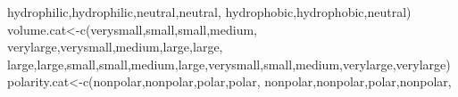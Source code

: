 \documentclass[
]{book}
\newenvironment{Shaded}{\begin{snugshade}}{\end{snugshade}}
\newcommand{\FunctionTok}[1]{\textcolor[rgb]{0.00,0.00,0.00}{#1}}
\newcommand{\NormalTok}[1]{#1}
\newcommand{\OtherTok}[1]{\textcolor[rgb]{0.56,0.35,0.01}{#1}}
\newcommand{\StringTok}[1]{\textcolor[rgb]{0.31,0.60,0.02}{#1}}
\begin{document}
\begin{Shaded}
\begin{Highlighting}[]
              \StringTok{\textquotesingle{}hydrophilic\textquotesingle{}}\NormalTok{,}\StringTok{\textquotesingle{}hydrophilic\textquotesingle{}}\NormalTok{,}\StringTok{\textquotesingle{}neutral\textquotesingle{}}\NormalTok{,}\StringTok{\textquotesingle{}neutral\textquotesingle{}}\NormalTok{,}
              \StringTok{\textquotesingle{}hydrophobic\textquotesingle{}}\NormalTok{,}\StringTok{\textquotesingle{}hydrophobic\textquotesingle{}}\NormalTok{,}\StringTok{\textquotesingle{}neutral\textquotesingle{}}\NormalTok{)}
\NormalTok{volume.cat}\OtherTok{\textless{}{-}}\FunctionTok{c}\NormalTok{(}\StringTok{\textquotesingle{}verysmall\textquotesingle{}}\NormalTok{,}\StringTok{\textquotesingle{}small\textquotesingle{}}\NormalTok{,}\StringTok{\textquotesingle{}small\textquotesingle{}}\NormalTok{,}\StringTok{\textquotesingle{}medium\textquotesingle{}}\NormalTok{,}
              \StringTok{\textquotesingle{}verylarge\textquotesingle{}}\NormalTok{,}\StringTok{\textquotesingle{}verysmall\textquotesingle{}}\NormalTok{,}\StringTok{\textquotesingle{}medium\textquotesingle{}}\NormalTok{,}\StringTok{\textquotesingle{}large\textquotesingle{}}\NormalTok{,}\StringTok{\textquotesingle{}large\textquotesingle{}}\NormalTok{,}
              \StringTok{\textquotesingle{}large\textquotesingle{}}\NormalTok{,}\StringTok{\textquotesingle{}large\textquotesingle{}}\NormalTok{,}\StringTok{\textquotesingle{}small\textquotesingle{}}\NormalTok{,}\StringTok{\textquotesingle{}small\textquotesingle{}}\NormalTok{,}\StringTok{\textquotesingle{}medium\textquotesingle{}}\NormalTok{,}\StringTok{\textquotesingle{}large\textquotesingle{}}\NormalTok{,}\StringTok{\textquotesingle{}verysmall\textquotesingle{}}\NormalTok{,}\StringTok{\textquotesingle{}small\textquotesingle{}}\NormalTok{,}\StringTok{\textquotesingle{}medium\textquotesingle{}}\NormalTok{,}\StringTok{\textquotesingle{}verylarge\textquotesingle{}}\NormalTok{,}\StringTok{\textquotesingle{}verylarge\textquotesingle{}}\NormalTok{)}
\NormalTok{polarity.cat}\OtherTok{\textless{}{-}}\FunctionTok{c}\NormalTok{(}\StringTok{\textquotesingle{}nonpolar\textquotesingle{}}\NormalTok{,}\StringTok{\textquotesingle{}nonpolar\textquotesingle{}}\NormalTok{,}\StringTok{\textquotesingle{}polar\textquotesingle{}}\NormalTok{,}\StringTok{\textquotesingle{}polar\textquotesingle{}}\NormalTok{,}
                \StringTok{\textquotesingle{}nonpolar\textquotesingle{}}\NormalTok{,}\StringTok{\textquotesingle{}nonpolar\textquotesingle{}}\NormalTok{,}\StringTok{\textquotesingle{}polar\textquotesingle{}}\NormalTok{,}\StringTok{\textquotesingle{}nonpolar\textquotesingle{}}\NormalTok{,}

\end{Highlighting}
\end{Shaded}
\end{document}
